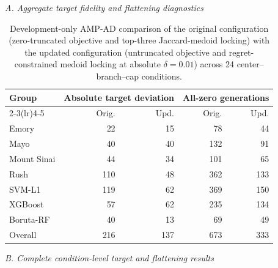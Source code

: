 \begin{table}[H]
\centering
\caption{Development-only AMP-AD comparison of the original configuration (zero-truncated objective and top-three Jaccard-medoid locking) with the updated configuration (untruncated objective and regret-constrained medoid locking at absolute $\delta=0.01$) across 24 center--branch--cap conditions.}
\label{tab:supp1}
\scriptsize
\setlength{\tabcolsep}{2.6pt}
\renewcommand{\arraystretch}{1.03}
\textit{A. Aggregate target fidelity and flattening diagnostics}\par\smallskip
\begin{tabular}{lrrrr}
\toprule
Group & \multicolumn{2}{c}{Absolute target deviation} & \multicolumn{2}{c}{All-zero generations} \\
\cmidrule(lr){2-3}\cmidrule(lr){4-5}
 & Orig. & Upd. & Orig. & Upd. \\
\midrule
Emory & 22 & 15 & 78 & 44 \\
Mayo & 40 & 40 & 132 & 91 \\
Mount Sinai & 44 & 34 & 101 & 65 \\
Rush & 110 & 48 & 362 & 133 \\
\midrule
SVM-L1 & 119 & 62 & 369 & 150 \\
XGBoost & 57 & 62 & 235 & 134 \\
Boruta-RF & 40 & 13 & 69 & 49 \\
\midrule
Overall & 216 & 137 & 673 & 333 \\
\bottomrule
\end{tabular}\par
\vspace{0.75em}
\textit{B. Complete condition-level target and flattening results}\par\smallskip
{}
\end{table}
